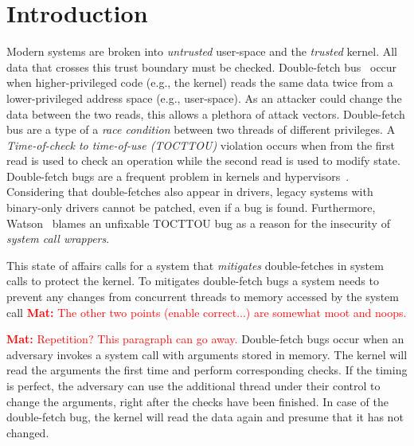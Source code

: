 \documentclass[conference]{IEEEtran}
\newcommand{\mat}[1]{\textcolor{red}{\textbf{Mat:} #1}}
\begin{document}
\section{Introduction}

Modern systems are broken into \emph{untrusted} user-space and the
\emph{trusted} kernel.  All data that crosses this trust boundary must be
checked.  Double-fetch bus~\cite{serna08doublefetch, twizsgrakky07ring0,
wilhelm2016xenpwn, wang2018survey} occur when higher-privileged code (e.g., the
kernel) reads the same data twice from a lower-privileged address space (e.g.,
user-space). As an attacker could change the data between the two reads, this
allows a plethora of attack vectors.  Double-fetch bus are a type of a
\emph{race condition} between two threads of different privileges. A
\emph{Time-of-check to time-of-use (TOCTTOU)} violation occurs when from the
first read is used to check an operation while the second read is used to modify
state.  Double-fetch bugs are a frequent problem in kernels and
hypervisors~\cite{cve201812633, cve202012652, cve20131332, cve201920610,
cve20158550, cve201610439, cve201610435, cve201610433, cve20195519,
cve20168438}. Considering that double-fetches also appear in drivers, legacy
systems with binary-only drivers cannot be patched, even if a bug is found.
Furthermore, Watson~\cite{watson2007} blames an unfixable TOCTTOU bug as a
reason for the insecurity of \emph{system call wrappers}.  

This state of affairs
calls for a system that \emph{mitigates} double-fetches in system calls to
protect the kernel.
%
To mitigates double-fetch bugs a system needs to
prevent any changes from concurrent threads to memory accessed by the system call
\mat{The other two points (enable correct...) are somewhat moot and noops.}

\mat{Repetition? This paragraph can go away.}
Double-fetch bugs occur when an adversary invokes a system call with arguments
stored in memory. The kernel will read the arguments the first time and perform
corresponding checks. If the timing is perfect, the adversary can use the
additional thread under their control to change the arguments, right after the
checks have been finished. In case of the double-fetch bug, the kernel
will read the data again and presume that it has not changed.
\end{document}
